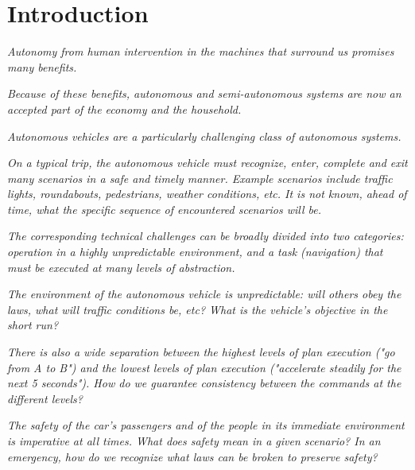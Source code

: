 \section{Introduction}
\label{introduction}

{\it Autonomy from human intervention in the machines that surround us promises many benefits.}

{\it Because of these benefits, autonomous and semi-autonomous systems are now an accepted part of the economy and the household.}

{\it Autonomous vehicles are a particularly challenging class of autonomous systems.}

{\it On a typical trip, the autonomous vehicle must recognize, enter, complete and exit many scenarios in a safe and timely manner. Example scenarios include traffic lights, roundabouts, pedestrians, weather conditions, etc. 
It is not known, ahead of time, what the specific sequence of encountered scenarios will be.}

{\it The corresponding technical challenges can be broadly divided into two categories: operation in a highly unpredictable environment, and a task (navigation) that must be executed at many levels of abstraction.}

{\it The environment of the autonomous vehicle is unpredictable: will others obey the laws, what will traffic conditions be, etc? What is the vehicle's objective in the short run?}

{\it There is also a wide separation between the highest levels of plan execution ("go from A to B") and the lowest levels of plan execution ("accelerate steadily for the next 5 seconds"). How do we guarantee consistency between the commands at the different levels?}

{\it The safety of the car's passengers and of the people in its immediate environment is imperative at all times. 
	What does safety mean in a given scenario?
	In an emergency, how do we recognize what laws can be broken to preserve safety?}

